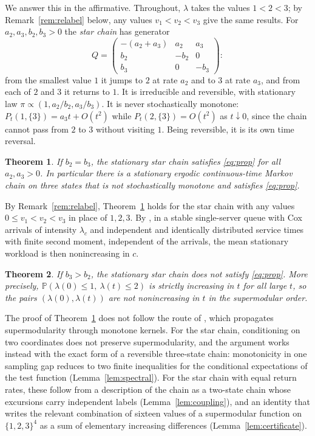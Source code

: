 \documentclass[11pt]{amsart}
\newtheorem{theorem}{Theorem}[section]
\theoremstyle{remark}
\numberwithin{equation}{section}
\newcommand{\Pp}{\mathbb P}
\newcommand{\1}{\mathbf 1}
\begin{document}
We answer this in the affirmative. Throughout, $\lambda$ takes the values $1<2<3$; by Remark~\ref{rem:relabel} below, any values $v_1<v_2<v_3$ give the same results. For $a_2,a_3,b_2,b_3>0$ the \emph{star chain} has generator
\begin{equation}\label{eq:star}
Q=\begin{pmatrix}-(a_2+a_3)&a_2&a_3\\ b_2&-b_2&0\\ b_3&0&-b_3\end{pmatrix}:
\end{equation}
from the smallest value $1$ it jumps to $2$ at rate $a_2$ and to $3$ at rate $a_3$, and from each of $2$ and $3$ it returns to $1$. It is irreducible and reversible, with stationary law $\pi\propto(1,a_2/b_2,a_3/b_3)$. It is never stochastically monotone: $P_t(1,\{3\})=a_3t+O(t^2)$ while $P_t(2,\{3\})=O(t^2)$ as $t\downarrow0$, since the chain cannot pass from $2$ to $3$ without visiting $1$. Being reversible, it is its own time reversal.

\begin{theorem}\label{thm:main}
If $b_2=b_3$, the stationary star chain satisfies \eqref{eq:prop} for all $a_2,a_3>0$. In particular there is a stationary ergodic continuous-time Markov chain on three states that is not stochastically monotone and satisfies \eqref{eq:prop}.
\end{theorem}

By Remark~\ref{rem:relabel}, Theorem~\ref{thm:main} holds for the star chain with any values $0\le v_1<v_2<v_3$ in place of $1,2,3$. By \cite{BR}, in a stable single-server queue with Cox arrivals of intensity $\lambda_c$ and independent and identically distributed service times with finite second moment, independent of the arrivals, the mean stationary workload is then nonincreasing in $c$.

\begin{theorem}\label{thm:fail}
If $b_3>b_2$, the stationary star chain does not satisfy \eqref{eq:prop}. More precisely, $\Pp(\lambda(0)\le1,\ \lambda(t)\le2)$ is strictly increasing in $t$ for all large $t$, so the pairs $(\lambda(0),\lambda(t))$ are not nonincreasing in $t$ in the supermodular order.
\end{theorem}

The proof of Theorem~\ref{thm:main} does not follow the route of \cite{BR}, which propagates supermodularity through monotone kernels. For the star chain, conditioning on two coordinates does not preserve supermodularity, and the argument works instead with the exact form of a reversible three-state chain: monotonicity in one sampling gap reduces to two finite inequalities for the conditional expectations of the test function (Lemma~\ref{lem:spectral}). For the star chain with equal return rates, these follow from a description of the chain as a two-state chain whose excursions carry independent labels (Lemma~\ref{lem:coupling}), and an identity that writes the relevant combination of sixteen values of a supermodular function on $\{1,2,3\}^4$ as a sum of elementary increasing differences (Lemma~\ref{lem:certificate}).
\end{document}

